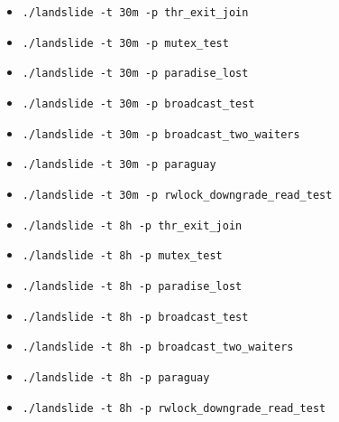 \documentclass{article}
\begin{document}
\begin{enumerate}
\begin{enumerate}
\begin{enumerate}
					\begin{itemize}
						\item \texttt{./landslide -t 30m -p thr\_exit\_join}
						\item \texttt{./landslide -t 30m -p mutex\_test}
						\item \texttt{./landslide -t 30m -p paradise\_lost}
						\item \texttt{./landslide -t 30m -p broadcast\_test}
						\item \texttt{./landslide -t 30m -p broadcast\_two\_waiters}
						\item \texttt{./landslide -t 30m -p paraguay}
						\item \texttt{./landslide -t 30m -p rwlock\_downgrade\_read\_test}
							\\
						\item \texttt{./landslide -t 8h -p thr\_exit\_join}
						\item \texttt{./landslide -t 8h -p mutex\_test}
						\item \texttt{./landslide -t 8h -p paradise\_lost}
						\item \texttt{./landslide -t 8h -p broadcast\_test}
						\item \texttt{./landslide -t 8h -p broadcast\_two\_waiters}
						\item \texttt{./landslide -t 8h -p paraguay}
						\item \texttt{./landslide -t 8h -p rwlock\_downgrade\_read\_test}
					\end{itemize}

\end{enumerate}
\end{enumerate}
\end{enumerate}
\end{document}
